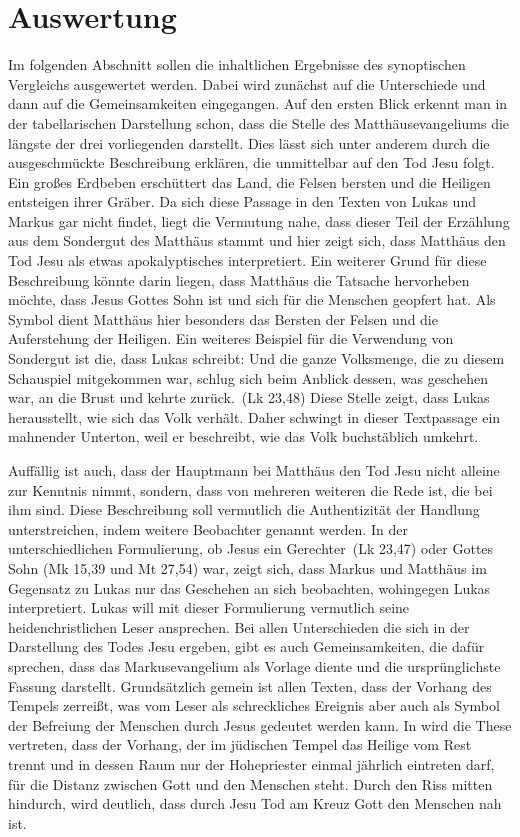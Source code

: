 \section{Auswertung}

Im folgenden Abschnitt sollen die inhaltlichen Ergebnisse des synoptischen Vergleichs ausgewertet werden. Dabei wird zunächst auf die Unterschiede und dann auf die Gemeinsamkeiten eingegangen.
Auf den ersten Blick erkennt man in der tabellarischen Darstellung schon, dass die Stelle des Matthäusevangeliums die längste der drei vorliegenden darstellt. Dies lässt sich unter anderem durch die ausgeschmückte Beschreibung erklären, die  unmittelbar auf den Tod Jesu folgt. Ein großes Erdbeben erschüttert das Land, die Felsen bersten und die Heiligen entsteigen ihrer Gräber. Da sich diese Passage in den Texten von Lukas und Markus gar nicht findet, liegt die Vermutung nahe, dass dieser Teil der Erzählung aus dem Sondergut des Matthäus stammt und hier zeigt sich, dass Matthäus den Tod Jesu als etwas apokalyptisches interpretiert. Ein weiterer Grund für diese Beschreibung könnte darin liegen, dass Matthäus die Tatsache hervorheben möchte, dass Jesus Gottes Sohn ist und sich für die Menschen geopfert hat. Als Symbol dient Matthäus hier besonders das Bersten der Felsen und die Auferstehung der Heiligen. Ein weiteres Beispiel für die Verwendung von Sondergut ist die, dass Lukas schreibt: \glqq Und die ganze Volksmenge, die zu diesem Schauspiel mitgekommen war, schlug sich beim Anblick dessen, was geschehen war, an die Brust und kehrte zurück.\grqq\ (Lk 23,48) Diese Stelle zeigt, dass Lukas herausstellt, wie sich das Volk verhält. Daher schwingt in dieser Textpassage ein mahnender Unterton, weil er beschreibt, wie das Volk buchstäblich umkehrt.

Auffällig ist auch, dass der Hauptmann bei Matthäus den Tod Jesu nicht alleine zur Kenntnis nimmt, sondern, dass von mehreren weiteren die Rede ist, die bei ihm sind. Diese Beschreibung soll vermutlich die Authentizität der Handlung unterstreichen, indem weitere Beobachter genannt werden. In der unterschiedlichen Formulierung, ob Jesus ein \glqq Gerechter\grqq\ (Lk 23,47) oder \glqq Gottes Sohn \grqq (Mk 15,39 und Mt 27,54) war, zeigt sich, dass Markus und Matthäus im Gegensatz zu Lukas nur das Geschehen an sich beobachten, wohingegen Lukas interpretiert. Lukas will mit dieser Formulierung vermutlich seine heidenchristlichen Leser ansprechen.
Bei allen Unterschieden die sich in der Darstellung des Todes Jesu ergeben, gibt es auch Gemeinsamkeiten, die dafür sprechen, dass das Markusevangelium als Vorlage diente und die ursprünglichste Fassung darstellt. Grundsätzlich gemein ist allen Texten, dass der Vorhang des Tempels zerreißt, was vom Leser als schreckliches Ereignis aber auch als Symbol der Befreiung der Menschen durch Jesus gedeutet werden kann. In \cite{AH04} wird die These vertreten, dass der Vorhang, der im jüdischen Tempel das Heilige vom Rest trennt und in dessen Raum nur der Hohepriester einmal jährlich eintreten darf, für die Distanz zwischen Gott und den Menschen steht. Durch den Riss mitten hindurch, wird deutlich, dass durch Jesu Tod am Kreuz Gott den Menschen nah ist.

